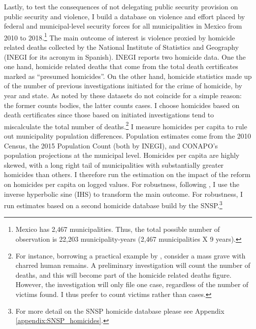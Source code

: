 \documentclass[12pt]{amsart}
\numberwithin{equation}{section}
\theoremstyle{definition}
\theoremstyle{definition}
\theoremstyle{definition}
\begin{document}
Lastly, to test the consequences of not delegating public security provision on public security and violence, I build a database on violence and effort placed by federal and municipal-level security forces for all municipalities in Mexico from 2010 to 2018.\footnote{Mexico has 2,467 municipalities. Thus, the total possible number of observation is 22,203 municipality-years (2,467 municipalities X 9 years).} The main outcome of interest is violence proxied by homicide related deaths collected by the National Institute of Statistics and Geography (INEGI for its acronym in Spanish). INEGI reports two homicide data. One the one hand, homicide related deaths that come from the total death certificates marked as ``presumed homicides''. On the other hand, homicide statistics made up of the number of previous investigations initiated for the crime of homicide, by year and state. As noted by \citet{rivera_2012} these datasets do not coincide for a simple reason: the former counts bodies, the latter counts cases. I choose homicides based on death certificates since those based on initiated investigations tend to miscalculate the total number of deaths.\footnote{For instance, borrowing a practical example by \citet{rivera_2012}, consider a mass grave with charred human remains. A preliminary investigation will count the number of deaths, and this will become part of the homicide related deaths figure. However, the investigation will only file one case, regardless of the number of victims found. I thus prefer to count victims rather than cases.} I measure homicides per capita to rule out municipality population differences. Population estimates come from the 2010 Census, the 2015 Population Count (both by INEGI), and CONAPO's population projections at the municipal level. Homicides per capita are highly skewed, with a long right tail of municipalities with substantially greater homicides than others. I therefore run the estimation on the impact of the reform on homicides per capita on logged values. For robustness, following \citet{mackinnon_maggie_1990}, I use the inverse hyperbolic sine (IHS) to transform the main outcome. For robustness, I run estimates based on a second homicide database build by the SNSP.\footnote{For more detail on the SNSP homicide database please see Appendix \ref{appendix:SNSP_homicides}.}
\end{document}

